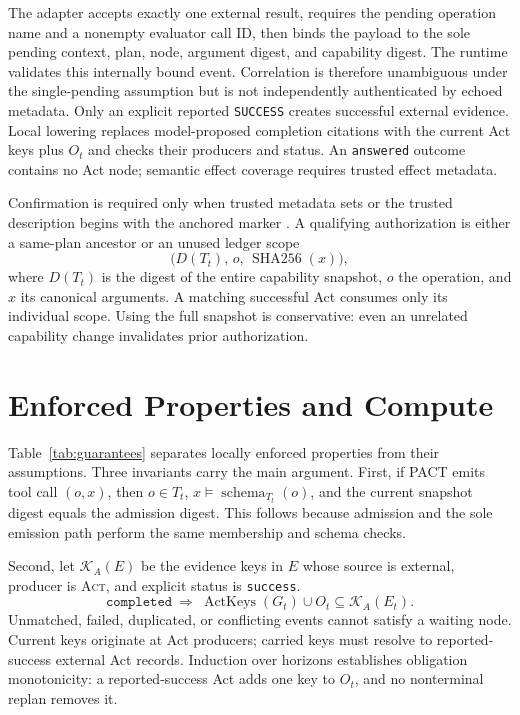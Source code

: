 \documentclass{article}
\begin{document}
The adapter accepts exactly one external result, requires the pending operation
name and a nonempty evaluator call ID, then binds the payload to the sole
pending context, plan, node, argument digest, and capability digest.  The
runtime validates this internally bound event.  Correlation is therefore
unambiguous under the single-pending assumption but is not independently
authenticated by echoed metadata.  Only an explicit reported
\texttt{SUCCESS} creates successful external evidence.  Local lowering
replaces model-proposed completion citations with the current Act keys plus
$O_t$ and checks their producers and status.  An \texttt{answered} outcome
contains no Act node; semantic effect coverage requires trusted effect metadata.

Confirmation is required only when trusted metadata sets
 or the trusted description begins with the
anchored marker .  A qualifying authorization is
either a same-plan ancestor or an unused ledger scope
\begin{equation}
 \bigl(D(T_t),\,o,\,\operatorname{SHA256}(x)\bigr),
 \label{eq:scope}
\end{equation}
where $D(T_t)$ is the digest of the entire capability snapshot, $o$ the
operation, and $x$ its canonical arguments.  A matching successful Act consumes
only its individual scope.  Using the full snapshot is conservative: even an
unrelated capability change invalidates prior authorization.

\section{Enforced Properties and Compute}

Table~\ref{tab:guarantees} separates locally enforced properties from their
assumptions.  Three invariants carry the main argument.  First, if PACT emits
tool call $(o,x)$, then $o\in T_t$, $x\models
\operatorname{schema}_{T_t}(o)$, and the current snapshot digest equals the
admission digest.  This follows because admission and the sole emission path
perform the same membership and schema checks.

Second, let $\mathcal{K}_{A}(E)$ be the evidence keys in $E$ whose source is
external, producer is \textsc{Act}, and explicit status is \texttt{success}.
\begin{equation}
\texttt{completed}\ \Longrightarrow\
\operatorname{ActKeys}(G_t)\cup O_t\subseteq\mathcal{K}_{A}(E_t).
\end{equation}
Unmatched, failed, duplicated, or conflicting events cannot satisfy a waiting
node.  Current keys originate at Act producers; carried keys must resolve to
reported-success external Act records.  Induction over horizons establishes
obligation monotonicity: a reported-success Act adds one key to $O_t$, and no
nonterminal replan removes it.
\end{document}
